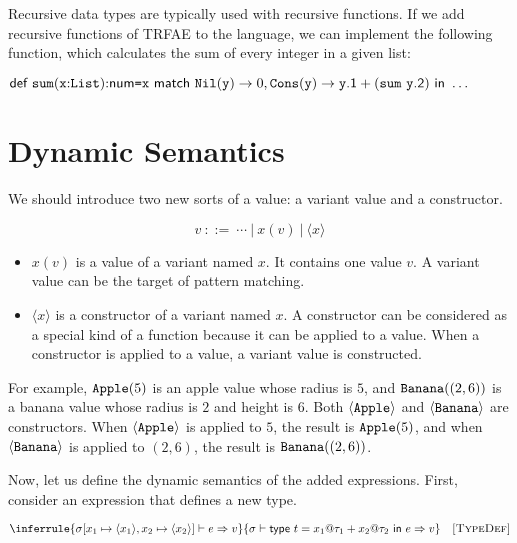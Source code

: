 Recursive data types are typically used with recursive functions. If we add
recursive functions of \textsf{TRFAE} to the language, we can implement the
following  function, which calculates the sum of every integer in a
given list:

$\erect{\code{sum}}{\cx}{\code{List}}{\tnum}{
  \ematch{\cx}{\code{Nil}}{\cy}{0}{\code{Cons}}{\cy}{
    \cy\textsf{.1}+(\code{sum}\ \cy\textsf{.2})
  }
}{\ldots}$

\section{Dynamic Semantics}

We should introduce two new sorts of a value: a variant value and a constructor.

\[ v \ ::= \ \cdots\ |\ x(v)\ |\ \langle x\rangle \]

\begin{itemize}
  \item $x(v)$ is a value of a variant named $x$. It contains one value $v$.
    A variant value can be the target of pattern matching.
  \item $\langle x\rangle$ is a constructor of a variant named $x$. A
    constructor can be considered as a special kind of a function because it can
    be applied to a value. When a constructor is applied to a value, a variant
    value is constructed.
\end{itemize}

For example, $\texttt{Apple}(5)$ is an apple value whose radius is $5$, and
$\texttt{Banana}((2,6))$ is a banana value whose radius is $2$ and height is $6$.
Both $\langle\texttt{Apple}\rangle$ and $\langle\texttt{Banana}\rangle$ are
constructors. When $\langle\texttt{Apple}\rangle$ is applied to $5$, the result is
$\texttt{Apple}(5)$, and when $\langle\texttt{Banana}\rangle$ is applied to $(2,6)$,
the result is $\texttt{Banana}((2,6))$.

Now, let us define the dynamic semantics of the added expressions. First,
consider an expression that defines a new type.


\vspace{-1em}

\[
  \inferrule
  { \eval{\sigma[x_1\mapsto \langle x_1\rangle,x_2\mapsto \langle x_2\rangle]}
    {e}{v} }
  { \evald{\etdef{t}{x_1}{\tau_1}{x_2}{\tau_2}{e}}{v} }
  \quad\textsc{[TypeDef]}
\]

